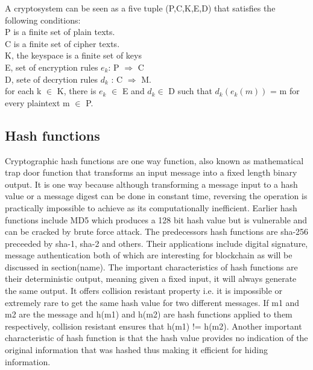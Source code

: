 A cryptosystem can be seen as a five tuple (P,C,K,E,D) that satisfies the following
conditions: \\ 
P is a finite set of plain texts.  \\
C is a finite set of cipher texts. \\ 
K, 	the keyspace is a finite set of keys \\
E, set of encryption rules $e_k$: P $\Rightarrow$ C \\
D, sete of decrytion rules $d_k$ : C $\Rightarrow$ M. \\
for each k $\in$ K, there is $e_{k}$ $\in$ E and $d_{k} \in$ D such that 
$d_{k}(e_{k}(m))$ = m for every plaintext m $\in$ P. \\


\subsection{Hash functions}
Cryptographic hash functions are one way function, also known as mathematical trap door function that transforms an input message into a fixed length binary output. It 
is one way because although transforming a message input to a hash value or a message 
digest can be done in constant time, reversing the operation is practically 
impossible to achieve as its computationally inefficient. 
Earlier hash functions include 
MD5 which produces a 128 bit hash value but is vulnerable and can be cracked by brute 
force attack. The predecessors hash functions are sha-256 preceeded by sha-1, sha-2
and others. 
Their applications include digital signature, message authentication both of 
which are interesting for blockchain as will be discussed in section(name). The
important characteristics of hash functions are their deterministic output, meaning
given a fixed input, it will always generate the same output. It offers collision 
resistant property i.e. it is 
impossible or extremely rare to get the same hash value for two different messages. 
If m1 and m2 are the message and h(m1) and h(m2) are hash functions applied to them 
respectively, collision resistant ensures that h(m1) != h(m2). 
Another important characteristic of hash function is that the hash value provides no 
indication of the original information that was hashed thus making it efficient for 
hiding information. 

